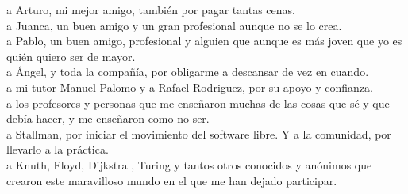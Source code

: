 \thispagestyle{empty}

\begin{center}
  \begin{flushright}
    a Arturo, mi mejor amigo, también por pagar tantas cenas. \\
    \vspace{0.3cm}
    a Juanca, un buen amigo y un gran profesional aunque no se lo crea. \\
    \vspace{0.3cm}
    a Pablo, un buen amigo, profesional y alguien que aunque es más joven que yo es quién quiero ser de mayor.\\
    \vspace{0.3cm}
    a Ángel, y toda la compañía, por obligarme a descansar de vez en cuando.\\
    \vspace{0.5cm}
    a mi tutor Manuel Palomo y a Rafael Rodriguez, por su apoyo y confianza.\\
    \vspace{0.5cm}
    a los profesores y personas que me enseñaron muchas de las cosas que sé y que debía hacer, y me enseñaron como no ser.\\
    \vspace{0.5cm}
    a Stallman, por iniciar el movimiento del software libre. Y a la comunidad, por llevarlo a la práctica.\\
    \vspace{0.5cm}
    a Knuth, Floyd, Dijkstra , Turing  y tantos otros conocidos y anónimos que crearon este maravilloso mundo en el que me han dejado participar.


  \end{flushright}
\end{center}



